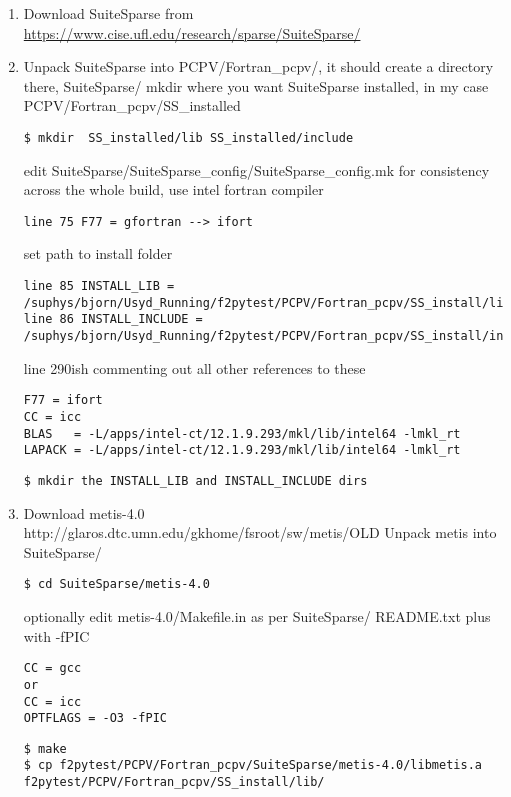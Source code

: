 \documentclass[11pt,a4paper,twoside]{report}
\begin{document}
\begin{enumerate}
\item Download SuiteSparse from \href{https://www.cise.ufl.edu/research/sparse/SuiteSparse/}{https://www.cise.ufl.edu/research/sparse/SuiteSparse/}


\item Unpack SuiteSparse into PCPV/Fortran\_pcpv/, it should create a directory there, SuiteSparse/
\lstset{language=bash}
mkdir where you want SuiteSparse installed, in my case PCPV/Fortran\_pcpv/SS\_installed
\begin{lstlisting}
$ mkdir  SS_installed/lib SS_installed/include
\end{lstlisting}

edit SuiteSparse/SuiteSparse\_config/SuiteSparse\_config.mk for consistency across the whole build, use intel fortran compiler
\begin{lstlisting}
line 75 F77 = gfortran --> ifort
\end{lstlisting}
set path to install folder
\begin{lstlisting}
line 85 INSTALL_LIB = /suphys/bjorn/Usyd_Running/f2pytest/PCPV/Fortran_pcpv/SS_install/lib
line 86 INSTALL_INCLUDE = /suphys/bjorn/Usyd_Running/f2pytest/PCPV/Fortran_pcpv/SS_install/include
\end{lstlisting}

line 290ish commenting out all other references to these
\begin{lstlisting}
F77 = ifort
CC = icc
BLAS   = -L/apps/intel-ct/12.1.9.293/mkl/lib/intel64 -lmkl_rt
LAPACK = -L/apps/intel-ct/12.1.9.293/mkl/lib/intel64 -lmkl_rt
\end{lstlisting}

\begin{lstlisting}
$ mkdir the INSTALL_LIB and INSTALL_INCLUDE dirs
\end{lstlisting}


\item Download metis-4.0 http://glaros.dtc.umn.edu/gkhome/fsroot/sw/metis/OLD
Unpack metis into SuiteSparse/
\begin{lstlisting}
$ cd SuiteSparse/metis-4.0
\end{lstlisting}
optionally edit metis-4.0/Makefile.in as per SuiteSparse/ README.txt plus with -fPIC
\begin{lstlisting}
CC = gcc
or 
CC = icc
OPTFLAGS = -O3 -fPIC
\end{lstlisting}
\begin{lstlisting}
$ make
$ cp f2pytest/PCPV/Fortran_pcpv/SuiteSparse/metis-4.0/libmetis.a f2pytest/PCPV/Fortran_pcpv/SS_install/lib/
\end{lstlisting}



\end{enumerate}
\end{document}
